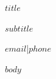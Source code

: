 \documentclass[10pt,letterpaper]{article}
\begin{document}
\raggedright
{}

\begin{center}
  {\fontsize{25}{29}\selectfont\bfseries $title$\par}
  \vspace{2pt}
  {\large $subtitle$\par}
  \vspace{4pt}
  \href{mailto:$email$}{$email$}\quad|\quad $phone$
\end{center}

$body$
\end{document}
